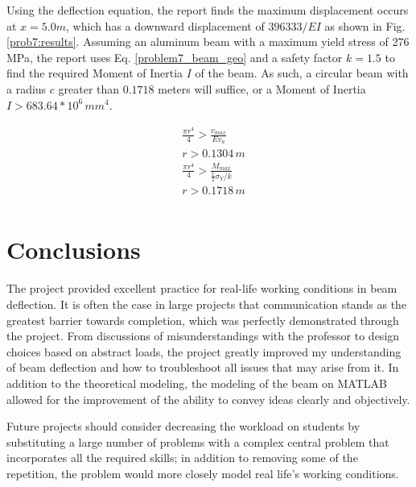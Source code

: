 \documentclass[a4paper]{article}
\begin{document}
Using the deflection equation, the report finds the maximum displacement occurs at $x = 5.0 m$, which has a downward displacement of $396333/EI$ as shown in Fig. \ref{prob7:results}. Assuming an aluminum beam with a maximum yield stress of 276 MPa, the report uses Eq. \ref{problem7_beam_geo} and a safety factor $k=1.5$ to find the required Moment of Inertia $I$ of the beam. As such, a circular beam with a radius $c$ greater than $0.1718$ meters will suffice, or a Moment of Inertia $I > 683.64 * 10^6\,{mm}^4$.

\begin{equation}
\begin{split}
& \frac{\pi r^4}{4} > \frac{v_{max}}{Ev_a} \\
& r > 0.1304\,m \\
& \frac{\pi r^4}{4} > \frac{M_{max}}{\frac{1}{2}\sigma_Y/ k}\\
& r > 0.1718\,m \\
\end{split}
\label{problem7_beam_geo}
\end{equation}

\section{Conclusions} \label{Conclusions}
The project provided excellent practice for real-life working conditions in beam deflection. It is often the case in large projects that communication stands as the greatest barrier towards completion, which was perfectly demonstrated through the project. From discussions of misunderstandings with the professor to design choices based on abstract loads, the project greatly improved my understanding of beam deflection and how to troubleshoot all issues that may arise from it. In addition to the theoretical modeling, the modeling of the beam on MATLAB allowed for the improvement of the ability to convey ideas clearly and objectively.

Future projects should consider decreasing the workload on students by substituting a large number of problems with a complex central problem that incorporates all the required skills; in addition to removing some of the repetition, the problem would more closely model real life's working conditions.




\end{document}
